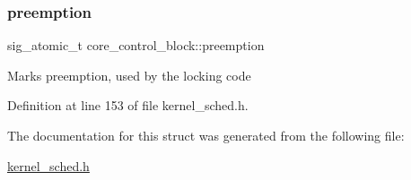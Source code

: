 \subsubsection{\texorpdfstring{preemption}{preemption}}
{\footnotesize\ttfamily sig\+\_\+atomic\+\_\+t core\+\_\+control\+\_\+block\+::preemption}

Marks preemption, used by the locking code 

Definition at line 153 of file kernel\+\_\+sched.\+h.



The documentation for this struct was generated from the following file\+:\begin{DoxyCompactItemize}
\item 
\hyperlink{kernel__sched_8h}{kernel\+\_\+sched.\+h}\end{DoxyCompactItemize}
